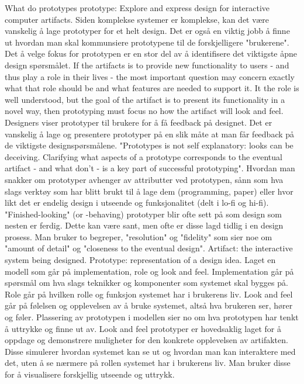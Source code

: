 What do prototypes prototype:
Explore and express design for interactive computer artifacts. Siden komplekse systemer er komplekse, kan det være vanskelig å lage prototyper for et helt design. Det er også en viktig jobb å finne ut hvordan man skal kommunsiere prototypene til de forskjelligere "brukerene". Det å velge fokus for prototypen er en stor del av å identifisere det viktigste åpne design spørsmålet. If the artifacts is to provide new functionality to users - and thus play a role in their lives - the most important question may concern exactly what that role should be and what features are needed to support it. It the role is well understood, but the goal of the artifact is to present its functionality in a novel way, then prototyping must focus no how the artifact will look and feel. Designers viser prototyper til brukere for å få feedback på designet. Det er vanskelig å lage og presentere prototyper på en slik måte at man får feedback på de viktigste designspørsmålene. "Prototypes is not self explanatory: looks can be deceiving. Clarifying what aspects of a prototype corresponds to the eventual artifact - and what don't - is a key part of successful prototyping". Hvordan man snakker om prototyper avhenger av attributter ved prototypen, sånn som hva slags verktøy som har blitt brukt til å lage dem (programming, paper) eller hvor likt det er endelig design i utseende og funksjonalitet (delt i lo-fi og hi-fi). "Finished-looking" (or -behaving) prototyper blir ofte sett på som design som nesten er ferdig. Dette kan være sant, men ofte er disse lagd tidlig i en design prosess. Man bruker to begreper, "resolution" og "fidelity" som sier noe om "amount of detail" og "closeness to the eventual design". Artifact: the interactive system being designed. Prototype: representation of a design idea. Laget en modell som går på implementation, role og look and feel. Implementation går på spørsmål om hva slags teknikker og komponenter som systemet skal bygges på. Role går på hvilken rolle og funksjon systemet har i brukerens liv. Look and feel går på følelsen og opplevelsen av å bruke systemet, altså hva brukeren ser, hører og føler. Plassering av prototypen i modellen sier no om hva prototypen har tenkt å uttrykke og finne ut av. Look and feel prototyper er hovedsaklig laget for å oppdage og demonstrere muligheter for den konkrete opplevelsen av artifakten. Disse simulerer hvordan systemet kan se ut og hvordan man kan interaktere med det, uten å se nærmere på rollen systemet har i brukerens liv. Man bruker disse for å visualisere forskjellig utseende og uttrykk. 


